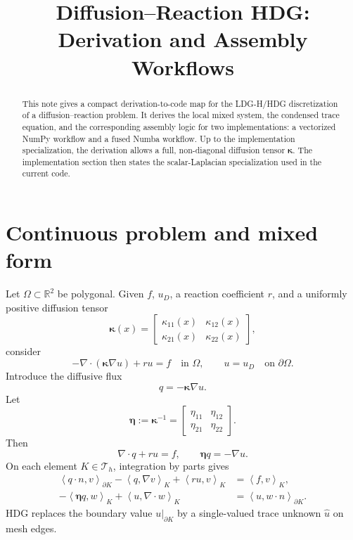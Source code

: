 \documentclass[11pt]{article}
\title{Diffusion--Reaction HDG: Derivation and Assembly Workflows}
\author{}
\date{}
\newcommand{\T}{\mathcal T_h}
\newcommand{\kappab}{\boldsymbol\kappa}
\newcommand{\etab}{\boldsymbol\eta}
\newcommand{\inner}[2]{\left\langle #1,#2\right\rangle}
\begin{document}
\maketitle

\begin{abstract}
This note gives a compact derivation-to-code map for the LDG-H/HDG discretization of a diffusion--reaction problem. It derives the local mixed system, the condensed trace equation, and the corresponding assembly logic for two implementations: a vectorized NumPy workflow and a fused Numba workflow. Up to the implementation specialization, the derivation allows a full, non-diagonal diffusion tensor $\kappab$. The implementation section then states the scalar-Laplacian specialization used in the current code.
\end{abstract}

\section{Continuous problem and mixed form}

Let $\Omega\subset\mathbb R^2$ be polygonal. Given $f$, $u_D$, a reaction coefficient $r$, and a uniformly positive diffusion tensor
\[
    \kappab(x)=
    \begin{bmatrix}
        \kappa_{11}(x) & \kappa_{12}(x)\\
        \kappa_{21}(x) & \kappa_{22}(x)
    \end{bmatrix},
\]
consider
\begin{equation}\label{eq:model}
    -\nabla\cdot(\kappab\nabla u)+ru=f\quad\text{in }\Omega,
    \qquad
    u=u_D\quad\text{on }\partial\Omega .
\end{equation}
Introduce the diffusive flux
\[
    q=-\kappab\nabla u .
\]
Let
\[
    \etab:=\kappab^{-1}
    =
    \begin{bmatrix}
        \eta_{11} & \eta_{12}\\
        \eta_{21} & \eta_{22}
    \end{bmatrix}.
\]
Then
\begin{equation}\label{eq:mixed-strong}
    \nabla\cdot q+ru=f,
    \qquad
    \etab q=-\nabla u.
\end{equation}
On each element $K\in\T$, integration by parts gives
\begin{align}
    \inner{q\cdot n}{v}_{\partial K}
    -\inner{q}{\nabla v}_{K}
    +\inner{ru}{v}_{K}
        &=\inner{f}{v}_{K}, \label{eq:weak-balance}\\
    -\inner{\etab q}{w}_{K}
    +\inner{u}{\nabla\cdot w}_{K}
        &=\inner{u}{w\cdot n}_{\partial K}. \label{eq:weak-flux}
\end{align}
HDG replaces the boundary value $u|_{\partial K}$ by a single-valued trace unknown $\widehat u$ on mesh edges.
\end{document}
